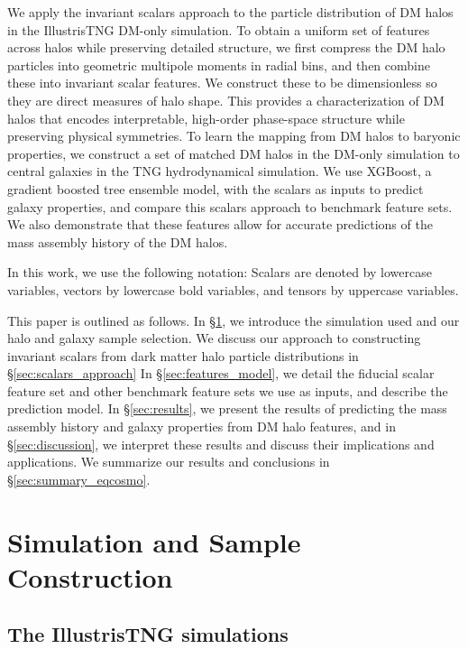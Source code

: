 We apply the invariant scalars approach to the particle distribution of DM halos in the IllustrisTNG DM-only simulation.
To obtain a uniform set of features across halos while preserving detailed structure, we first compress the DM halo particles into geometric multipole moments in radial bins, and then combine these into invariant scalar features.
We construct these to be dimensionless so they are direct measures of halo shape.
This provides a characterization of DM halos that encodes interpretable, high-order phase-space structure while preserving physical symmetries.
To learn the mapping from DM halos to baryonic properties, we construct a set of matched DM halos in the DM-only simulation to central galaxies in the TNG hydrodynamical simulation.
We use XGBoost, a gradient boosted tree ensemble model, with the scalars as inputs to predict galaxy properties, and compare this scalars approach to benchmark feature sets. 
We also demonstrate that these features allow for accurate predictions of the mass assembly history of the DM halos.

In this work, we use the following notation: 
Scalars are denoted by lowercase variables, vectors by lowercase bold variables, and tensors by uppercase variables.

This paper is outlined as follows.
In \S\ref{sec:sim_sample}, we introduce the simulation used and our halo and galaxy sample selection. 
We discuss our approach to constructing invariant scalars from dark matter halo particle distributions in \S\ref{sec:scalars_approach} 
In \S\ref{sec:features_model}, we detail the fiducial scalar feature set and other benchmark feature sets we use as inputs, and describe the prediction model.
In \S\ref{sec:results}, we present the results of predicting the mass assembly history and galaxy properties from DM halo features, and in \S\ref{sec:discussion}, we interpret these results and discuss their implications and applications.
We summarize our results and conclusions in \S\ref{sec:summary_eqcosmo}.


\section{Simulation and Sample Construction}
\label{sec:sim_sample}

\subsection{The IllustrisTNG simulations}
\label{sec:sim}

